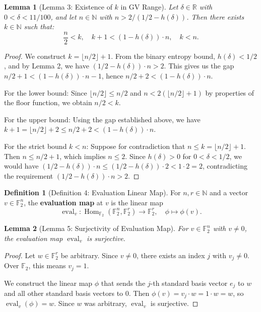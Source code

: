 \documentclass[11pt]{article}
\theoremstyle{plain}
\newtheorem*{lemma}{Lemma}
\theoremstyle{definition}
\newtheorem*{definition}{Definition}
\theoremstyle{remark}
\begin{document}
\begin{lemma}[Lemma 3: Existence of $k$ in GV Range]
Let $\delta \in \mathbb{R}$ with $0 < \delta < 11/100$, and let $n \in \mathbb{N}$ with $n > 2/(1/2 - h(\delta))$. Then there exists $k \in \mathbb{N}$ such that:
\[
\frac{n}{2} < k, \quad k + 1 < (1 - h(\delta))\cdot n, \quad k < n.
\]
\end{lemma}

\begin{proof}
We construct $k = \lfloor n/2 \rfloor + 1$. From the binary entropy bound, $h(\delta) < 1/2$, and by Lemma 2, we have $(1/2 - h(\delta)) \cdot n > 2$. This gives us the gap $n/2 + 1 < (1 - h(\delta)) \cdot n - 1$, hence $n/2 + 2 < (1 - h(\delta)) \cdot n$.

For the lower bound: Since $\lfloor n/2 \rfloor \leq n/2$ and $n < 2(\lfloor n/2 \rfloor + 1)$ by properties of the floor function, we obtain $n/2 < k$.

For the upper bound: Using the gap established above, we have $k + 1 = \lfloor n/2 \rfloor + 2 \leq n/2 + 2 < (1 - h(\delta)) \cdot n$.

For the strict bound $k < n$: Suppose for contradiction that $n \leq k = \lfloor n/2 \rfloor + 1$. Then $n \leq n/2 + 1$, which implies $n \leq 2$. Since $h(\delta) > 0$ for $0 < \delta < 1/2$, we would have $(1/2 - h(\delta)) \cdot n \leq (1/2 - h(\delta)) \cdot 2 < 1 \cdot 2 = 2$, contradicting the requirement $(1/2 - h(\delta)) \cdot n > 2$.
\end{proof}

\begin{definition}[Definition 4: Evaluation Linear Map]
For $n, r \in \mathbb{N}$ and a vector $v \in \mathbb{F}_2^n$, the \textbf{evaluation map} at $v$ is the linear map
\[
\operatorname{eval}_v : \operatorname{Hom}_{\mathbb{F}_2}(\mathbb{F}_2^n, \mathbb{F}_2^r) \to \mathbb{F}_2^r, \quad \phi \mapsto \phi(v).
\]
\end{definition}

\begin{lemma}[Lemma 5: Surjectivity of Evaluation Map]
For $v \in \mathbb{F}_2^n$ with $v \neq 0$, the evaluation map $\operatorname{eval}_v$ is surjective.
\end{lemma}

\begin{proof}
Let $w \in \mathbb{F}_2^r$ be arbitrary. Since $v \neq 0$, there exists an index $j$ with $v_j \neq 0$. Over $\mathbb{F}_2$, this means $v_j = 1$.

We construct the linear map $\phi$ that sends the $j$-th standard basis vector $e_j$ to $w$ and all other standard basis vectors to $0$. Then $\phi(v) = v_j \cdot w = 1 \cdot w = w$, so $\operatorname{eval}_v(\phi) = w$. Since $w$ was arbitrary, $\operatorname{eval}_v$ is surjective.
\end{proof}
\end{document}
